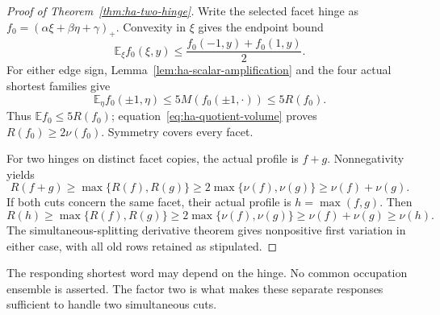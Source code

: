 \begin{proof}[Proof of Theorem~\ref{thm:ha-two-hinge}]
Write the selected facet hinge as $f_0=(\alpha\xi+\beta\eta+\gamma)_+$.
Convexity in $\xi$ gives the endpoint bound
\[
 \mathbb E_\xi f_0(\xi,y)
       \leq\frac{f_0(-1,y)+f_0(1,y)}2.
\]
For either edge sign, Lemma~\ref{lem:ha-scalar-amplification} and the four
actual shortest families give
\[
 \mathbb E_\eta f_0(\pm1,\eta)
       \leq5M(f_0(\pm1,\cdot))\leq5R(f_0).
\]
Thus $\mathbb E f_0\leq5R(f_0)$; equation~\eqref{eq:ha-quotient-volume}
proves $R(f_0)\geq2\nu(f_0)$. Symmetry covers every facet.

For two hinges on distinct facet copies, the actual profile is $f+g$.
Nonnegativity yields
\[
 R(f+g)\geq\max\{R(f),R(g)\}
 \geq2\max\{\nu(f),\nu(g)\}\geq\nu(f)+\nu(g).
\]
If both cuts concern the same facet, their actual profile is $h=\max(f,g)$.
Then
\[
 R(h)\geq\max\{R(f),R(g)\}
 \geq2\max\{\nu(f),\nu(g)\}
 \geq\nu(f)+\nu(g)\geq\nu(h).
\]
The simultaneous-splitting derivative theorem gives nonpositive first
variation in either case, with all old rows retained as stipulated.
\end{proof}

The responding shortest word may depend on the hinge. No common occupation
ensemble is asserted. The factor two is what makes these separate responses
sufficient to handle two simultaneous cuts.
